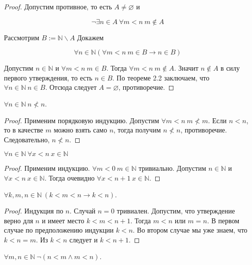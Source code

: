 {\begin{proof} Допустим противное, то есть $A \neq \varnothing$ и

$$\neg \exists n \in A \ \forall m<n \  m \notin A$$

Рассмотрим $B:=\mathbb{N} \backslash A$ Докажем

$$\forall n \in \mathbb{N}(\forall m<n \  m \in B \rightarrow n \in B)$$

Допустим $n \in \mathbb{N}$ и $\forall m<n \  m \in B$. Тогда $\forall m<n \ m \notin A$. Значит $n \notin A$ в силу первого утверждения, то есть $n \in B$. По теореме 2.2 заключаем, что $\forall n \in \mathbb{N} \ n \in B$. Отсюда следует $A = \varnothing$, противоречие.
\end{proof}

\begin{corollary}
$\forall n \in \mathbb{N} \ n \not<n$.
\end{corollary}

\begin{proof} 
Применим порядковую индукцию. Допустим $\forall m < n \ m \not< m$. Если $ n < n$, то в качестве $m$ можно взять само $n$, тогда получим
$n \not< n$, противоречие. Следовательно, $n \not< n$. 
\end{proof}

\begin{corollary} 
$\forall n \in \mathbb{N} \ \forall x<n \ x \in \mathbb{N}$ 
\end{corollary}

\begin{proof} 
Применим индукцию. $\forall m < 0 \ m \in \mathbb{N}$ тривиально.
Допустим $n \in \mathbb{N}$ и $\forall x<n \ x \in \mathbb{N}$. Тогда очевидно $\forall x<n+1 \ x \in \mathbb{N}$. 
\end{proof}

\begin{corollary} 
$\forall k, m, n \in \mathbb{N} \ (k<m<n \rightarrow k<n)$.
\end{corollary}

\begin{proof} 
Индукция по $n$. Случай $n = 0$ тривиален. Допустим, что утверждение верно для $n$ и имеет место $k<m<n + 1$. Тогда $m < n$ или $m = n$. В первом случае по предположению индукции $k < n$. Во втором случае мы уже знаем, что $k < n = m$. Из $k < n$ следует и
$k < n + 1$. 
\end{proof}

\begin{corollary} 
$\forall m, n \in \mathbb{N} \ \neg(n<m \wedge m<n)$.
\end{corollary}

}
